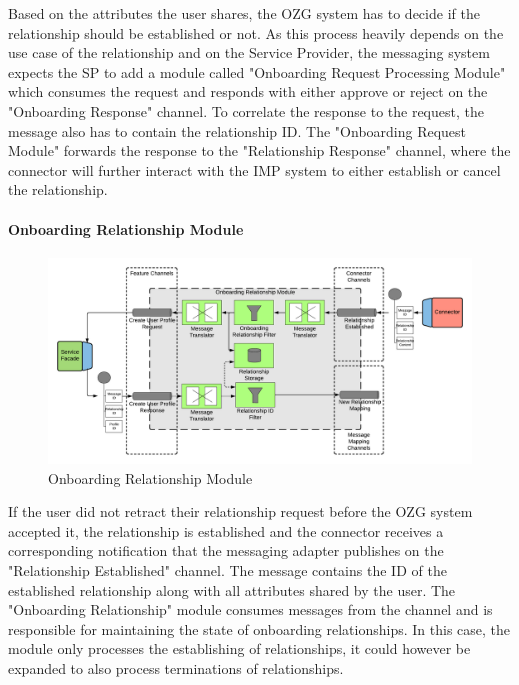 Based on the attributes the user shares, the OZG system has to decide if the relationship should be established or not. As this process heavily depends on the use case of the relationship and on the Service Provider, the messaging system expects the SP to add a module called "Onboarding Request Processing Module" which consumes the request and responds with either approve or reject on the "Onboarding Response" channel. To correlate the response to the request, the message also has to contain the relationship ID. The "Onboarding Request Module" forwards the response to the "Relationship Response" channel, where the connector will further interact with the IMP system to either establish or cancel the relationship.

\paragraph{Onboarding Relationship Module}

\begin{figure}[h!]
    \centering
    \includegraphics[scale=0.6]{Diagrams/Integration Architecture 1/Technological Integration/8. Onboarding Relationship Module.pdf}
    \caption{Onboarding Relationship Module}
    \label{integration1:onboarding_relationship_module}
\end{figure}

If the user did not retract their relationship request before the OZG system accepted it, the relationship is established and the connector receives a corresponding notification that the messaging adapter publishes on the "Relationship Established" channel. The message contains the ID of the established relationship along with all attributes shared by the user. The "Onboarding Relationship" module consumes messages from the channel and is responsible for maintaining the state of onboarding relationships. In this case, the module only processes the establishing of relationships, it could however be expanded to also process terminations of relationships.

